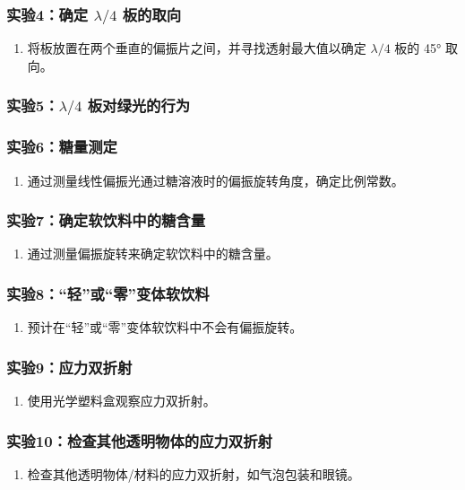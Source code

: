 \documentclass{ctexart}
\begin{document}
\subsubsection{实验4：确定 $\lambda/4$ 板的取向}
\begin{enumerate}
    \item 将板放置在两个垂直的偏振片之间，并寻找透射最大值以确定 $\lambda/4$ 板的 45° 取向。
\end{enumerate}

\subsubsection{实验5：$\lambda/4$ 板对绿光的行为}


\subsubsection{实验6：糖量测定}
\begin{enumerate}
    \item 通过测量线性偏振光通过糖溶液时的偏振旋转角度，确定比例常数。
\end{enumerate}

\subsubsection{实验7：确定软饮料中的糖含量}
\begin{enumerate}
    \item 通过测量偏振旋转来确定软饮料中的糖含量。
\end{enumerate}

\subsubsection{实验8：“轻”或“零”变体软饮料}
\begin{enumerate}
    \item 预计在“轻”或“零”变体软饮料中不会有偏振旋转。
\end{enumerate}

\subsubsection{实验9：应力双折射}
\begin{enumerate}
    \item 使用光学塑料盒观察应力双折射。
\end{enumerate}

\subsubsection{实验10：检查其他透明物体的应力双折射}
\begin{enumerate}
    \item 检查其他透明物体/材料的应力双折射，如气泡包装和眼镜。
\end{enumerate}
\end{document}
